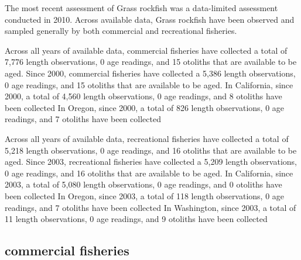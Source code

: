 \documentclass[11pt,
  english,
  letterpaper,
]{article}
\begin{document}
\leavevmode\tagmcend\tagstructend


The most recent assessment of Grass rockfish was a data-limited assessment conducted in 2010. Across available data, Grass rockfish have been observed and sampled generally by both commercial and recreational fisheries.

\leavevmode\tagmcend\tagstructend\par


Across all years of available data, commercial fisheries have collected a total of 7,776 length observations, 0 age readings, and 15 otoliths that are available to be aged. Since 2000, commercial fisheries have collected a 5,386 length observations, 0 age readings, and 15 otoliths that are available to be aged. In California, since 2000, a total of 4,560 length observations, 0 age readings, and 8 otoliths have been collected In Oregon, since 2000, a total of 826 length observations, 0 age readings, and 7 otoliths have been collected

\leavevmode\tagmcend\tagstructend\par


Across all years of available data, recreational fisheries have collected a total of 5,218 length observations, 0 age readings, and 16 otoliths that are available to be aged. Since 2003, recreational fisheries have collected a 5,209 length observations, 0 age readings, and 16 otoliths that are available to be aged. In California, since 2003, a total of 5,080 length observations, 0 age readings, and 0 otoliths have been collected In Oregon, since 2003, a total of 118 length observations, 0 age readings, and 7 otoliths have been collected In Washington, since 2003, a total of 11 length observations, 0 age readings, and 9 otoliths have been collected

\leavevmode\tagmcend\tagstructend\par


\hypertarget{commercial-fisheries-23}{%
\subsection{commercial fisheries}\label{commercial-fisheries-23}}
\end{document}
